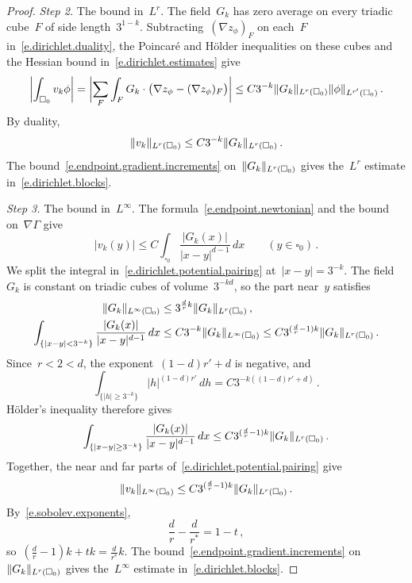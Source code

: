 \documentclass[11pt,letterpaper]{article}
\numberwithin{equation}{section}
\theoremstyle{definition}
\newcommand{\cu}{\square}
\DeclarePairedDelimiter{\norm}{\lVert}{\rVert}
\begin{document}
\begin{proof}
\emph{Step 2.} The bound in~$L^r$. The field~$G_k$ has zero average on every triadic cube~$F$ of side length~$3^{1-k}$. Subtracting~$(\nabla z_\phi)_F$ on each~$F$ in~\eqref{e.dirichlet.duality}, the Poincar\'e and H\"older inequalities on these cubes and the Hessian bound in~\eqref{e.dirichlet.estimates} give
\begin{equation*}
	\biggl|\int_{\cu_0}v_k\phi\biggr|=\biggl|\sum_F\int_FG_k\cdot\bigl(\nabla z_\phi-(\nabla z_\phi)_F\bigr)\biggr|\leq C3^{-k}\norm{G_k}_{L^r(\cu_0)}\norm{\phi}_{L^{r'}(\cu_0)}\,.
\end{equation*}
By duality,
\begin{equation*}
	\norm{v_k}_{L^r(\cu_0)}\leq C3^{-k}\norm{G_k}_{L^r(\cu_0)}\,.
\end{equation*}
The bound~\eqref{e.endpoint.gradient.increments} on~$\norm{G_k}_{L^r(\cu_0)}$ gives the~$L^r$ estimate in~\eqref{e.dirichlet.blocks}.

\smallskip

\emph{Step 3.} The bound in~$L^\infty$. The formula~\eqref{e.endpoint.newtonian} and the bound on~$\nabla\Gamma$ give
\begin{equation}
	|v_k(y)|\leq C\int_{\cu_0}\frac{|G_k(x)|}{|x-y|^{d-1}}\,dx\qquad(y\in\cu_0)\,.
	\label{e.dirichlet.potential.pairing}
\end{equation}
We split the integral in~\eqref{e.dirichlet.potential.pairing} at~$|x-y|=3^{-k}$. The field~$G_k$ is constant on triadic cubes of volume~$3^{-kd}$, so the part near~$y$ satisfies
\begin{align*}
	\norm{G_k}_{L^\infty(\cu_0)}&\leq3^{\frac drk}\norm{G_k}_{L^r(\cu_0)}\,,\\
	\int_{\{|x-y|<3^{-k}\}}\frac{|G_k(x)|}{|x-y|^{d-1}}\,dx&\leq C3^{-k}\norm{G_k}_{L^\infty(\cu_0)}\leq C3^{(\frac dr-1)k}\norm{G_k}_{L^r(\cu_0)}\,.
\end{align*}
Since~$r<2<d$, the exponent~$(1-d)r'+d$ is negative, and
\begin{equation*}
	\int_{\{|h|\geq3^{-k}\}}|h|^{(1-d)r'}\,dh=C3^{-k((1-d)r'+d)}\,.
\end{equation*}
H\"older's inequality therefore gives
\begin{equation*}
	\int_{\{|x-y|\geq3^{-k}\}}\frac{|G_k(x)|}{|x-y|^{d-1}}\,dx\leq C3^{(\frac dr-1)k}\norm{G_k}_{L^r(\cu_0)}\,.
\end{equation*}
Together, the near and far parts of~\eqref{e.dirichlet.potential.pairing} give
\begin{equation*}
	\norm{v_k}_{L^\infty(\cu_0)}\leq C3^{(\frac dr-1)k}\norm{G_k}_{L^r(\cu_0)}\,.
\end{equation*}
By~\eqref{e.sobolev.exponents},
\begin{equation}
	\frac dr-\frac d{r^*}=1-t\,,
	\label{e.endpoint.exponents}
\end{equation}
so~$(\frac dr-1)k+tk=\frac d{r^*}k$. The bound~\eqref{e.endpoint.gradient.increments} on~$\norm{G_k}_{L^r(\cu_0)}$ gives the~$L^\infty$ estimate in~\eqref{e.dirichlet.blocks}.


\end{proof}
\end{document}
